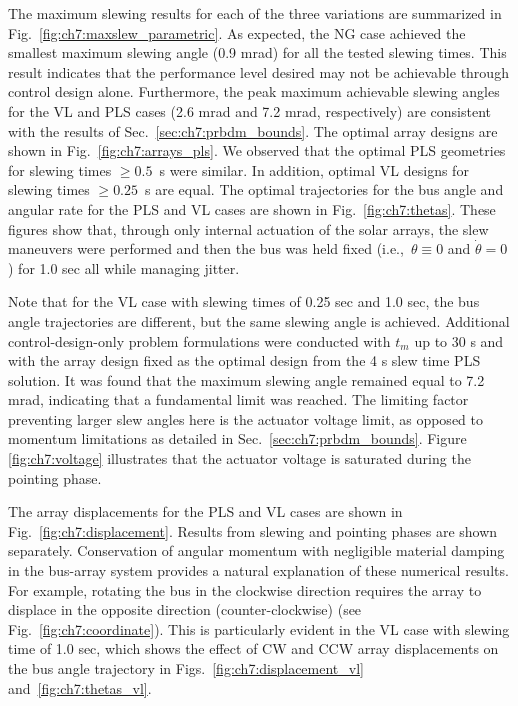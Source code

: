 The maximum slewing results for each of the three variations are summarized in Fig.~\ref{fig:ch7:maxslew_parametric}. As expected, the NG case achieved the smallest maximum slewing angle (0.9 mrad) for all the tested slewing times. This result indicates that the performance level desired may not be achievable through control design alone. Furthermore, the peak maximum achievable slewing angles for the VL and PLS cases (2.6 mrad and 7.2 mrad, respectively) are consistent with the results of Sec.~\ref{sec:ch7:prbdm_bounds}. The optimal array designs are shown in Fig.~\ref{fig:ch7:arrays_pls}. We observed that the optimal PLS geometries for slewing times $\geq 0.5$~s were similar. In addition, optimal VL designs for slewing times $\geq 0.25$~s are equal. The optimal trajectories for the bus angle and angular rate for the PLS and VL cases are shown in Fig.~\ref{fig:ch7:thetas}. These figures show that, through only internal actuation of the solar arrays, the slew maneuvers were performed and then the bus was held fixed (i.e.,~$\theta \equiv 0$ and $\dot{\theta} = 0$) for 1.0 sec all while managing jitter.

Note that for the VL case with slewing times of 0.25 sec and 1.0 sec, the bus angle trajectories are different, but the same slewing angle is achieved. Additional control-design-only problem formulations were conducted with $t_m$ up to 30 s and with the array design fixed as the optimal design from the 4 s slew time PLS solution. It was found that the maximum slewing angle remained equal to 7.2 mrad, indicating that a fundamental limit was reached. The limiting factor preventing larger slew angles here is the actuator voltage limit, as opposed to momentum limitations as detailed in Sec.~\ref{sec:ch7:prbdm_bounds}. Figure \ref{fig:ch7:voltage} illustrates that the actuator voltage is saturated during the pointing phase.







The array displacements for the PLS and VL cases are shown in Fig.~\ref{fig:ch7:displacement}. Results from slewing and pointing phases are shown separately. Conservation of angular momentum with negligible material damping in the bus-array system provides a natural explanation of these numerical results. For example, rotating the bus in the clockwise direction requires the array to displace in the opposite direction (counter-clockwise) (see Fig.~\ref{fig:ch7:coordinate}). This is particularly evident in the VL case with slewing time of 1.0 sec, which shows the effect of CW and CCW array displacements on the bus angle trajectory in Figs.~\ref{fig:ch7:displacement_vl} and~\ref{fig:ch7:thetas_vl}.

